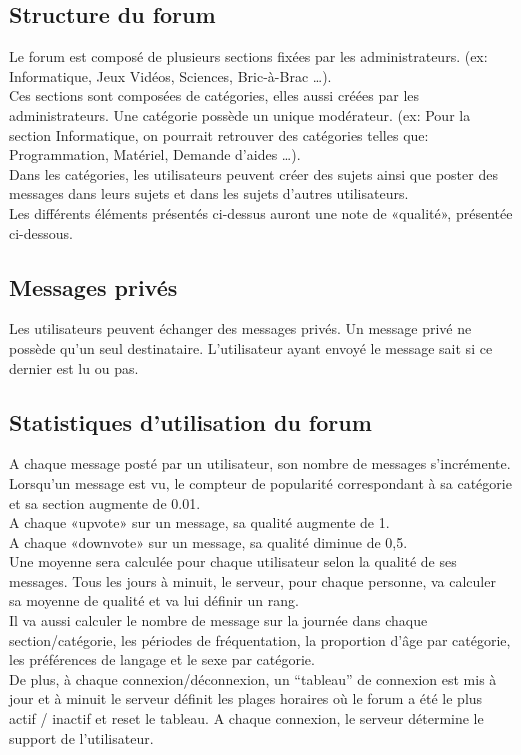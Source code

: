\documentclass{report}
\begin{document}
\subsection{Structure du forum}
		Le forum est composé de plusieurs sections fixées 	par les administrateurs. (ex:  Informatique, Jeux Vidéos, 	Sciences, Bric-à-Brac …).\\
		Ces sections sont composées de catégories, elles 	aussi créées par les administrateurs. Une catégorie 		possède un unique modérateur. (ex: Pour la section 		Informatique, on pourrait retrouver des catégories telles 	que:  Programmation, Matériel, Demande d'aides …).\\
		Dans les catégories, les utilisateurs peuvent créer 	des sujets ainsi que poster des messages dans leurs 		sujets et dans les sujets d'autres utilisateurs.\\
		Les différents éléments présentés ci-dessus auront 	une note de «qualité», présentée ci-dessous.\\
\subsection{Messages privés}
Les utilisateurs peuvent échanger des messages privés. Un message privé ne possède qu'un seul destinataire. L'utilisateur ayant envoyé le message sait si ce dernier est lu ou pas.

\subsection{Statistiques d’utilisation du forum}
		A chaque message posté par un utilisateur, son nombre 	de messages s'incrémente.\\
		Lorsqu'un message est vu, le compteur de popularité 	correspondant à sa catégorie et sa section augmente de 0.01.\\
		A chaque «upvote» sur un message, sa qualité augmente 	de 1.\\
		A chaque «downvote» sur un message, sa qualité 	diminue de 0,5.\\
		Une moyenne sera calculée pour chaque utilisateur selon 	la qualité de ses messages.
		Tous les jours à minuit, le serveur, pour chaque 	personne, va calculer sa moyenne de qualité et va lui définir 	un rang.\\
		Il va aussi calculer le nombre de message sur la journée 	dans chaque section/catégorie, les périodes de fréquentation, 	la proportion d'âge par catégorie, les préférences de langage 	et le sexe par catégorie.\\
		De plus, à chaque connexion/déconnexion, un “tableau” 	de connexion est mis à jour et à minuit le serveur définit les 	plages horaires où le forum a été le plus actif / inactif et reset 	le tableau.
		A chaque connexion, le serveur détermine le support de 	l’utilisateur.\\
\end{document}
